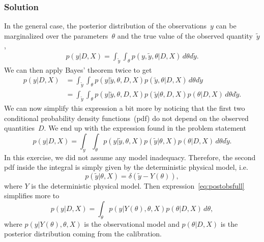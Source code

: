 \documentclass{article}
\begin{document}
\subsubsection*{Solution}

In the general case, the posterior distribution of the observations~$y$
can be marginalized over the parameters~$\theta$ and the true value
of the observed quantity~$\tilde{y}$,
\begin{align*}
p(y|D,X)=\int_{\tilde{y}}\int_{\theta}p(y,\tilde{y},\theta|D,X)\, d\theta d\tilde{y}.
\end{align*}
 We can then apply Bayes' theorem twice to get
\begin{align*}
p(y|D,X) & =\int_{\tilde{y}}\int_{\theta}p(y|\tilde{y},\theta,D,X)p(\tilde{y},\theta|D,X)\, d\theta d\tilde{y}\\
 & =\int_{\tilde{y}}\int_{\theta}p(y|\tilde{y},\theta,D,X)p(\tilde{y}|\theta,D,X)p(\theta|D,X)\, d\theta d\tilde{y}.
\end{align*}
 We can now simplify this expression a bit more by noticing that the
first two conditional probability density functions~(pdf) do not
depend on the observed quantities~$D$. We end up with the expression
found in the problem statement
\begin{equation}
p(y|D,X)=\int_{\tilde{y}}\int_{\theta}p(y|\tilde{y},\theta,X)p(\tilde{y}|\theta,X)p(\theta|D,X)\, d\theta d\tilde{y}.\label{eq:postobsfull}
\end{equation}
 In this exercise, we did not assume any model inadequacy. Therefore,
the second pdf inside the integral is simply given by the deterministic
physical model, i.e.
\[
p(\tilde{y}|\theta,X)=\delta(\tilde{y}-Y(\theta)),
\]
 where $Y$ is the deterministic physical model. Then expression~\ref{eq:postobsfull}
simplifies more to
\begin{equation}
p(y|D,X)=\int_{\theta}p(y|Y(\theta),\theta,X)p(\theta|D,X)\, d\theta,\label{eq:postobs}
\end{equation}
 where $p(y|Y(\theta),\theta,X)$ is the observational model and $p(\theta|D,X)$
is the posterior distribution coming from the calibration.
\end{document}
